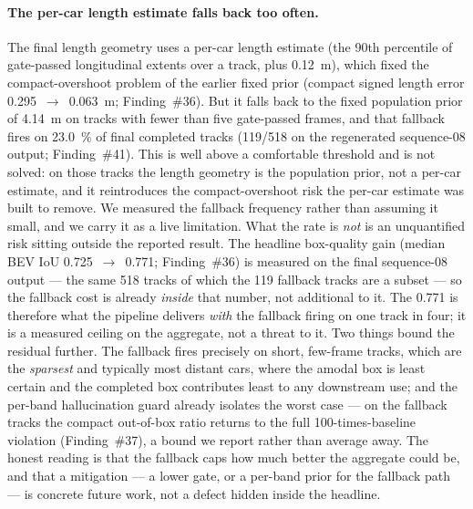 \paragraph{The per-car length estimate falls back too often.}
The final length geometry uses a per-car length estimate (the \num{90}th percentile of
gate-passed longitudinal extents over a track, plus \SI{0.12}{\metre}), which fixed the
compact-overshoot problem of the earlier fixed prior (compact signed length error
\num{+0.295}~$\rightarrow$~\num{+0.063}~m; Finding~\#36). But it falls back to the fixed
population prior of \SI{4.14}{\metre} on tracks with fewer than five gate-passed frames,
and that fallback fires on \SI{23.0}{\percent} of final completed tracks
(\num{119}/\num{518} on the regenerated sequence-08 output; Finding~\#41). This is well
above a comfortable threshold and is not solved: on those tracks the length geometry is
the population prior, not a per-car estimate, and it reintroduces the compact-overshoot
risk the per-car estimate was built to remove. We measured the fallback frequency rather
than assuming it small, and we carry it as a live limitation. What the rate is \emph{not}
is an unquantified risk sitting outside the reported result. The headline box-quality gain
(median BEV IoU \num{0.725}~$\rightarrow$~\num{0.771}; Finding~\#36) is measured on the
final sequence-08 output --- the same \num{518} tracks of which the \num{119} fallback
tracks are a subset --- so the fallback cost is already \emph{inside} that number, not
additional to it. The \num{0.771} is therefore what the pipeline delivers \emph{with} the
fallback firing on one track in four; it is a measured ceiling on the aggregate, not a
threat to it. Two things bound the residual further. The fallback fires precisely on
short, few-frame tracks, which are the \emph{sparsest} and typically most distant cars,
where the amodal box is least certain and the completed box contributes least to any
downstream use; and the per-band hallucination guard already isolates the worst case ---
on the fallback tracks the compact out-of-box ratio returns to the full
\num{100}-times-baseline violation (Finding~\#37), a bound we report rather than average
away. The honest reading is that the fallback caps how much better the aggregate could be,
and that a mitigation --- a lower gate, or a per-band prior for the fallback path ---
is concrete future work, not a defect hidden inside the headline.

